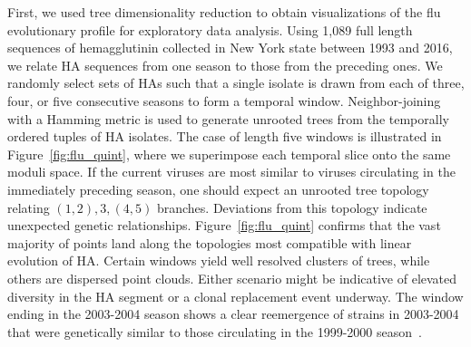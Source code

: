 \documentclass[a4paper,11pt]{article}
\begin{document}
First, we used tree dimensionality reduction to obtain visualizations of the flu evolutionary profile for exploratory data analysis.
Using 1,089 full length sequences of hemagglutinin collected in New York state between 1993 and 2016, we relate HA sequences from one season to those from the preceding ones.
We randomly select sets of HAs such that a single isolate is drawn from each of three, four, or five consecutive seasons to form a temporal window.
Neighbor-joining with a Hamming metric is used to generate unrooted trees from the temporally ordered tuples of HA isolates.
The case of length five windows is illustrated in Figure~\ref{fig:flu_quint}, where we superimpose each temporal slice onto the same moduli space.
If the current viruses are most similar to viruses circulating in the immediately preceding season, one should expect an unrooted tree topology relating $(1,2),3,(4,5)$ branches.
Deviations from this topology indicate unexpected genetic relationships.
Figure~\ref{fig:flu_quint} confirms that the vast majority of points land along the topologies most compatible with linear evolution of HA.
Certain windows yield well resolved clusters of trees, while others are dispersed point clouds.
Either scenario might be indicative of elevated diversity in the HA segment or a clonal replacement event underway.
The window ending in the 2003-2004 season shows a clear reemergence of strains in 2003-2004 that were genetically similar to those circulating in the 1999-2000 season~\cite{holmes2005whole}.
\end{document}
